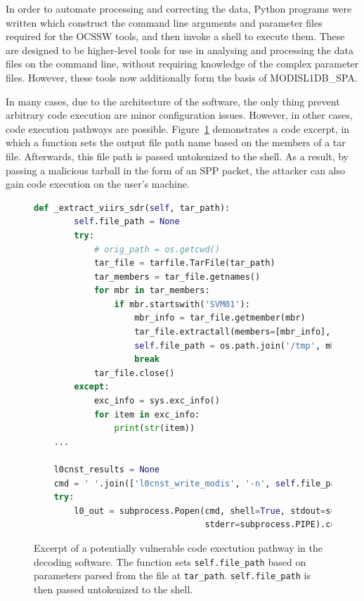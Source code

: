 In order to automate processing and correcting the data, Python programs were written which construct the command line arguments and parameter files required for the OCSSW tools, and then invoke a shell to execute them.
These are designed to be higher-level tools for use in analysing and processing the data files on the command line, without requiring knowledge of the complex parameter files.
However, these tools now additionally form the basis of MODISL1DB\_SPA.

In many cases, due to the architecture of the software, the only thing prevent arbitrary code execution are minor configuration issues.
However, in other cases, code execution pathways are possible.
Figure~\ref{fig:code-execution} demonstrates a code excerpt, in which a function sets the output file path name based on the members of a tar file.
Afterwards, this file path is passed untokenized to the shell.
As a result, by passing a malicious tarball in the form of an SPP packet, the attacker can also gain code execution on the user's machine.

\begin{figure}
    \centering
    \begin{lstlisting}[language=Python]
    def _extract_viirs_sdr(self, tar_path):
        self.file_path = None
        try:
            # orig_path = os.getcwd()
            tar_file = tarfile.TarFile(tar_path)
            tar_members = tar_file.getnames()
            for mbr in tar_members:
                if mbr.startswith('SVM01'):
                    mbr_info = tar_file.getmember(mbr)
                    tar_file.extractall(members=[mbr_info], path='/tmp')
                    self.file_path = os.path.join('/tmp', mbr)
                    break
            tar_file.close()
        except:
            exc_info = sys.exc_info()
            for item in exc_info:
                print(str(item))
    ...

    l0cnst_results = None
    cmd = ' '.join(['l0cnst_write_modis', '-n', self.file_path])
    try:
        l0_out = subprocess.Popen(cmd, shell=True, stdout=subprocess.PIPE,
                                  stderr=subprocess.PIPE).communicate()[0]
    \end{lstlisting}
    \caption{Excerpt of a potentially vulnerable code exectution pathway in the decoding software. The function sets \texttt{self.file\_path} based on parameters parsed from the file at \texttt{tar\_path}. \texttt{self.file\_path} is then passed untokenized to the shell.}
    \label{fig:code-execution}
\end{figure}

